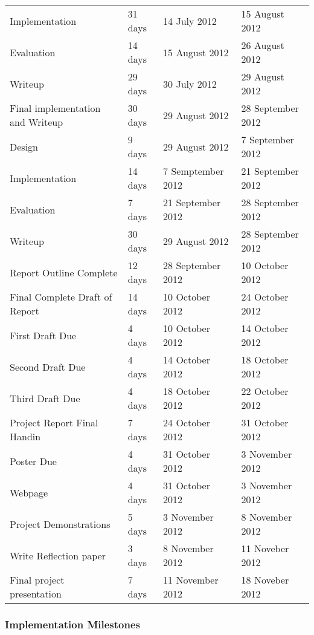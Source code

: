 \documentclass[12pt,a4paper]{article}
\begin{document}
\begin{tabular}{l||l|l|l}
    \indent Implementation & 31 days & 14 July 2012 & 15 August 2012 \\
    \indent Evaluation & 14 days & 15 August 2012 & 26 August 2012  \\
    \indent Writeup & 29 days & 30 July 2012 & 29 August 2012 \\
    \hline
    Final implementation and Writeup & 30 days & 29 August 2012 & 28 September 2012 \\
    \indent Design & 9 days   & 29 August 2012  & 7 September 2012 \\
    \indent Implementation & 14 days & 7 Semptember 2012 & 21 September 2012 \\
    \indent Evaluation & 7 days & 21 September 2012  & 28 September 2012 \\
    \indent Writeup & 30 days & 29 August 2012 & 28 September 2012 \\
    \hline
    Report Outline Complete & 12 days  &28 September 2012 & 10 October 2012 \\
    \hline
    Final Complete Draft of Report & 14 days & 10 October 2012 & 24 October 2012 \\
    \indent First Draft Due & 4 days &10 October 2012 & 14 October 2012 \\
    \indent Second Draft Due & 4 days &14 October 2012 & 18 October 2012 \\
    \indent Third Draft Due & 4 days  &18 October 2012 & 22 October 2012 \\
    \hline
    Project Report Final Handin & 7 days & 24 October 2012 & 31 October 2012 \\
    \hline
    Poster Due & 4 days  & 31 October 2012 & 3 November 2012 \\
    \hline
    Webpage & 4 days & 31 October 2012 & 3 November 2012 \\
    \hline
    Project Demonstrations & 5 days & 3 November 2012 & 8 November 2012 \\
    \hline
    Write Reflection paper &3 days & 8 November 2012 & 11 Noveber 2012 \\
    \hline
    Final project presentation & 7 days &11 November 2012 & 18 Noveber 2012 \\

\end{tabular}
\subsubsection{Implementation Milestones}
\end{document}
